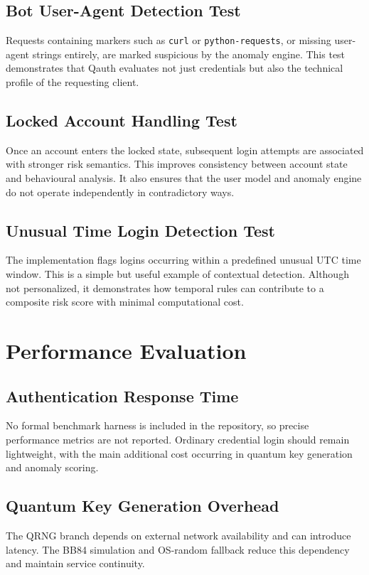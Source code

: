 \documentclass[12pt,a4paper]{report}
\begin{document}
\subsection{Bot User-Agent Detection Test}
Requests containing markers such as \texttt{curl} or \texttt{python-requests}, or missing user-agent strings entirely, are marked suspicious by the anomaly engine. This test demonstrates that Qauth evaluates not just credentials but also the technical profile of the requesting client.

\subsection{Locked Account Handling Test}
Once an account enters the locked state, subsequent login attempts are associated with stronger risk semantics. This improves consistency between account state and behavioural analysis. It also ensures that the user model and anomaly engine do not operate independently in contradictory ways.

\subsection{Unusual Time Login Detection Test}
The implementation flags logins occurring within a predefined unusual UTC time window. This is a simple but useful example of contextual detection. Although not personalized, it demonstrates how temporal rules can contribute to a composite risk score with minimal computational cost.

\section{Performance Evaluation}

\subsection{Authentication Response Time}
No formal benchmark harness is included in the repository, so precise performance metrics are not reported. Ordinary credential login should remain lightweight, with the main additional cost occurring in quantum key generation and anomaly scoring.

\subsection{Quantum Key Generation Overhead}
The QRNG branch depends on external network availability and can introduce latency. The BB84 simulation and OS-random fallback reduce this dependency and maintain service continuity.
\end{document}

